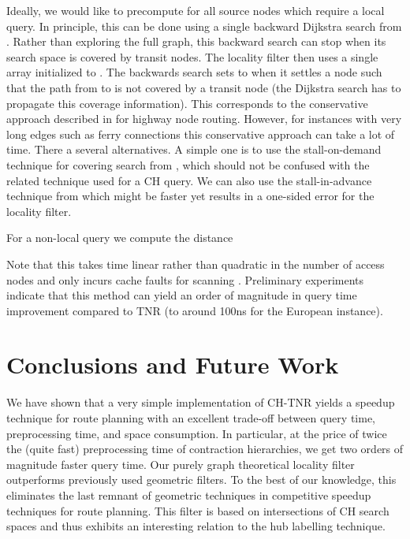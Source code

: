 \documentclass{llncs}
\begin{document}
Ideally, we would like to precompute  for all source nodes  which require a local query. 
In principle, this can be done using a single backward Dijkstra search from . 
Rather than exploring the full graph, this backward search can stop when its search space is covered by transit nodes. 
The locality filter then uses a single array  initialized to . 
The backwards search sets  to  when it settles a node  such that the path from  to  is not covered by a transit node (the Dijkstra search has to propagate this coverage information).
This corresponds to the conservative approach described in \cite{s-rprn-08} for highway node routing. 
However, for instances with very long edges such as ferry connections this conservative approach can take a lot of time.
There a several alternatives. 
A simple one is to use the stall-on-demand technique for covering search from \cite{s-rprn-08}, which should not be confused with the related technique used for a CH query.
We can also use the stall-in-advance technique from \cite{s-rprn-08} which might be faster yet results in a one-sided error for the locality filter.

For a non-local query we compute the distance

Note that this takes time linear rather than quadratic in the number of access nodes and only incurs cache faults for scanning .
Preliminary experiments indicate that this method can yield an order of magnitude in query time improvement compared to TNR (to around 100ns for the European instance).




\section{Conclusions and Future Work}\label{sec:tnr-conclusion}

We have shown that a very simple implementation of CH-TNR yields a speedup technique for route planning with an excellent trade-off between query time, preprocessing time, and space consumption.  In particular, at the price of twice the (quite fast) preprocessing time of contraction hierarchies, we get two orders of magnitude faster query time.  Our purely graph theoretical locality filter outperforms previously used geometric filters. To the best of our knowledge, this eliminates the last remnant of geometric techniques in competitive speedup techniques for route planning.  This filter is based on intersections of CH search spaces and thus exhibits an interesting relation to the hub labelling technique.
\end{document}
